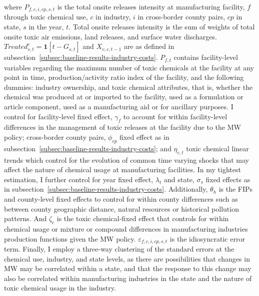 \documentclass[12pt, english]{article}
\begin{document}
    where $P_{f,c,i,cp,s,t}$ is the total onsite releases intensity at manufacturing facility, $f$ through toxic chemical use, $c$ in industry, $i$ in cross-border county pairs, $cp$ in state, $s$ in the year, $t$. Total onsite releases intensity is the sum of weights of total onsite toxic air emissions, land releases, and surface water discharges. $Treated_{s,t}^e = \textbf{1}[t - G_{s,t}]$ and $X_{v,c,t-1}$ are as defined in subsection~\ref{subsec:baseline-results-industry-costs}. $P_{f,t}$ contains facility-level variables regarding the maximum number of toxic chemicals at the facility at any point in time, production/activity ratio index of the facility, and the following dummies: industry ownership, and toxic chemical attributes, that is, whether the chemical was produced at or imported to the facility, used as a formulation or article component, used as a manufacturing aid or for ancillary purposes. I control for facility-level fixed effect, $\gamma_{f}$ to account for within facility-level differences in the management of toxic releases at the facility due to the MW policy; cross-border county pairs, $\phi_{cp}$ fixed effect as in subsection~\ref{subsec:baseline-results-industry-costs}; and $\eta_{c,t}$ toxic chemical linear trends which control for the evolution of common time varying shocks that may affect the nature of chemical usage at manufacturing facilities. In my tightest estimation, I further control for year fixed effect, $\lambda_{t}$ and state, $\sigma_{s}$ fixed effects as in subsection~\ref{subsec:baseline-results-industry-costs}. Additionally,  $\theta_{h}$ is the FIPs and county-level fixed effects to control for within county differences such as between county geographic distance, natural resources or historical pollution patterns. And $\zeta_{c}$ is the toxic chemical-fixed effect that controls for within chemical usage or mixture or compound differences in manufacturing industries production functions given the MW policy. $\varepsilon_{f,c,i,cp,s,t}$ is the idiosyncratic error term. Finally, I employ a three-way clustering of the standard errors at the chemical use, industry, and state levels, as there are possibilities that changes in MW may be correlated within a state, and that the response to this change may also be correlated within manufacturing industries in the state and the nature of toxic chemical usage in the industry.
    
\end{document}
